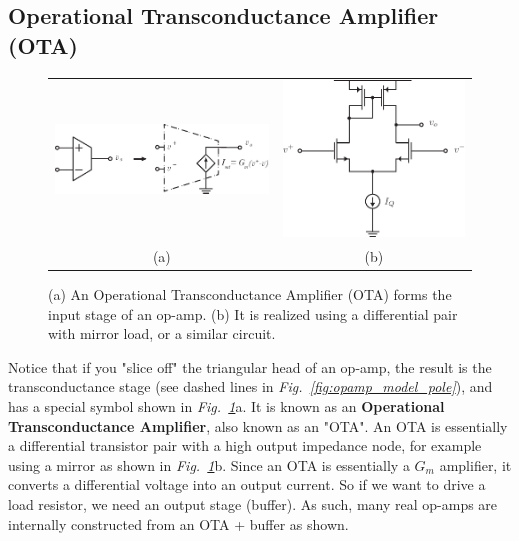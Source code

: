 \subsection{Operational Transconductance Amplifier (OTA)}
\begin{figure}[tb]
\centering
\begin{tabular}{cc}
\includegraphics[scale=1]{OTA} &
\includegraphics[width=.3\columnwidth]{Diffpair_se_output.pdf}\\
(a) & (b)\\
\end{tabular}
\caption{(a) An Operational Transconductance Amplifier (OTA) forms the input stage of an op-amp.  (b) It is realized using a differential pair with mirror load, or a similar circuit.}
\label{fig:OTA}
\end{figure}
Notice that if you "slice off" the triangular head of an op-amp, the result is the transconductance stage (see dashed lines in \emph{Fig.~\ref{fig:opamp_model_pole}}), and has a special symbol shown in \emph{Fig.~\ref{fig:OTA}}a.  It is known as an \textbf{Operational Transconductance Amplifier}, also known as an "OTA".  An OTA is essentially a differential transistor pair with a high output impedance node, for example using a mirror as shown in \emph{Fig.~\ref{fig:OTA}}b.
Since an OTA is essentially a $G_m$ amplifier, it converts a differential voltage into an output current.  So if we want to drive a load resistor, we need an output stage (buffer).  As such, many real op-amps are internally constructed from an OTA + buffer as shown.
